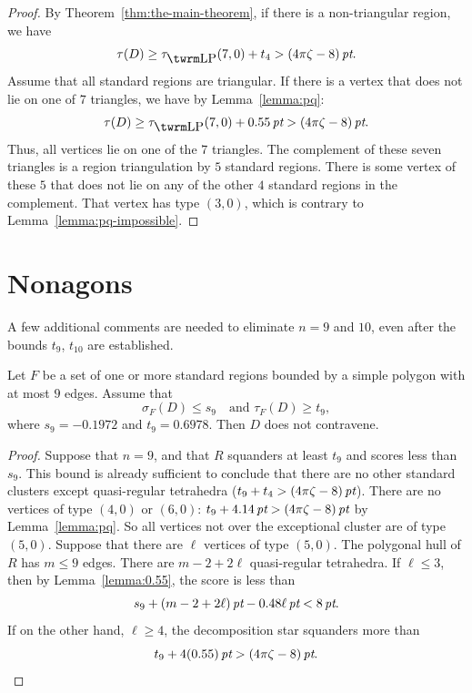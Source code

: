 \begin{proof} By Theorem~\ref{thm:the-main-theorem},
if there is a non-triangular region, we have
    $$\tau(D)\ge\tlp(7,0)+t_4>\squander.$$
Assume that all standard regions are triangular.  If there is a
vertex that does not lie on one of $7$ triangles, we have by
Lemma~\ref{lemma:pq}:
    $$\tau(D)\ge\tlp(7,0)+0.55\,\pt>\squander.$$
Thus, all vertices lie on one of the $7$ triangles.  The
complement of these seven triangles is a region triangulation by
$5$ standard regions.  There is some vertex of these $5$ that does
not lie on any of the other $4$ standard regions in the
complement.  That vertex has type $(3,0)$, which is contrary to
Lemma~\ref{lemma:pq-impossible}.
\end{proof}

\section{Nonagons}
    \label{sec:nonagon}

A few additional comments are needed to eliminate $n=9$ and $10$,
even after the bounds $t_9$, $t_{10}$ are established.

\begin{lemma} \label{lemma:s9-t9}
Let $F$ be a set of one or more standard regions bounded by a
simple polygon with at most $9$ edges.  Assume  that
    $$\sigma_F(D) \le s_9\quad\text{and }\tau_F(D)\ge t_9,$$
where $s_9=-0.1972$ and $t_9=0.6978$.  Then $D$ does not
contravene.
\end{lemma}

\begin{proof}
Suppose that $n=9$, and that $R$ squanders at least $t_9$ and
scores less than $s_9$.  This bound is already sufficient to
conclude that there are no other standard clusters except
quasi-regular tetrahedra ($t_9+t_4>(4\pi\zeta-8)\,\hbox{\it pt}$). There are no
vertices of type $(4,0)$ or $(6,0)$: $t_9+4.14\,\hbox{\it pt}>(4\pi\zeta-8)\,\hbox{\it pt}$ by
Lemma~\ref{lemma:pq}.   So all vertices not over the exceptional
cluster are of type $(5,0)$. Suppose that there are $\ell$
vertices of type $(5,0)$. The polygonal hull of $R$ has $m\le 9$
edges. There are $m-2+2\ell$ quasi-regular tetrahedra. If $\ell\le
3$, then by Lemma~\ref{lemma:0.55}, the score is less than
    $$s_9+ (m-2+2\ell)\,\hbox{\it pt} -0.48 \ell\,\hbox{\it pt} < 8\,\hbox{\it pt}.$$
If on the other hand, $\ell\ge 4$, the decomposition star
squanders more than
    $$t_9+ 4(0.55)\,\hbox{\it pt} > (4\pi\zeta-8)\,\hbox{\it pt}.$$
\end{proof}


